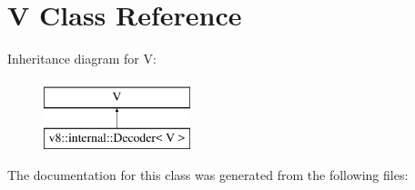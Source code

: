 \hypertarget{classV}{}\section{V Class Reference}
\label{classV}
Inheritance diagram for V\+:\begin{figure}[H]
\begin{center}
\leavevmode
\includegraphics[height=2.000000cm]{classV}
\end{center}
\end{figure}


The documentation for this class was generated from the following files\+: